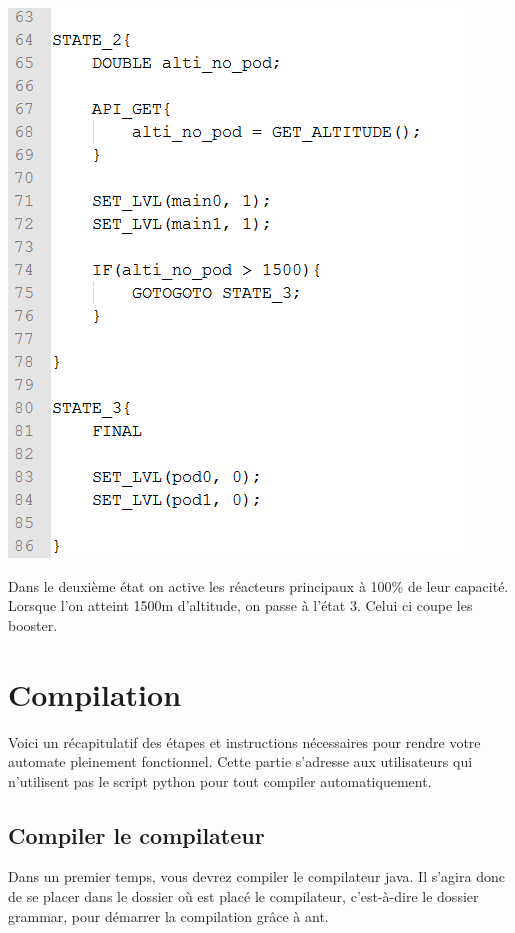 \documentclass[a4paper,11pt]{article}
\begin{document}
        \begin{center}
            \includegraphics[scale=0.75]{img/otto3.png}
        \end{center}

        Dans le deuxième état on active les réacteurs principaux à 100\% de leur capacité.
        Lorsque l'on atteint 1500m d'altitude, on passe à l'état 3. Celui ci coupe les booster.


\section{Compilation}
    Voici un récapitulatif des étapes et instructions nécessaires pour rendre votre automate pleinement fonctionnel. Cette partie s'adresse aux utilisateurs qui n'utilisent pas le script python pour tout compiler automatiquement.

    \subsection{Compiler le compilateur}
        \onehalfspacing 
        Dans un premier temps, vous devrez compiler le compilateur java. Il s'agira donc de se placer dans le dossier où est placé le compilateur, c'est-à-dire le dossier grammar, pour démarrer la compilation grâce à ant.
\end{document}
